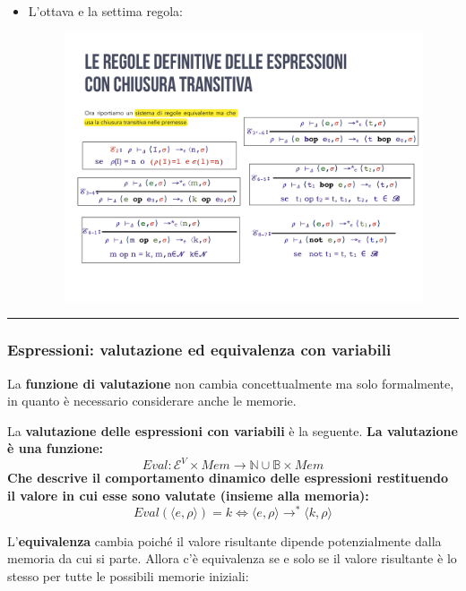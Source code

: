 \documentclass[a4paper]{article}
\newcommand{\longline}{\noindent\rule{\textwidth}{0.4pt}}
\begin{document}
\begin{itemize}
 		\item L'ottava e la settima regola:
 		\begin{figure}[!htp]
 			\centering
 			\includegraphics[width=.7\textwidth]{img/regola_espressione-up-transitiva-8_7.pdf}
 		\end{figure}
 	\end{itemize}
 
 	\longline
 	
 	\subsubsection{Espressioni: valutazione ed equivalenza con variabili}
 	
 	La \textbf{funzione di valutazione} non cambia concettualmente ma solo formalmente, in quanto è necessario considerare anche le memorie.
 	
 	\begin{boxdef}
 		La \textcolor{Red3}{\textbf{valutazione delle espressioni con variabili}} è la seguente. \textbf{La valutazione è una funzione:}
 		\begin{equation*}
 			Eval: \mathcal{E}^{V} \times Mem \longrightarrow \mathbb{N} \cup \mathbb{B} \times Mem
 		\end{equation*}
 		\textbf{Che descrive il comportamento dinamico delle espressioni restituendo il valore in cui esse sono valutate (insieme alla memoria):}
 		\begin{equation*}
 			Eval\left(\langle e, \rho \rangle\right) = k \iff \langle e,\rho \rangle \longrightarrow^{*} \langle k,\rho \rangle
 		\end{equation*}
 	\end{boxdef}\:\newline
 
 	\noindent
 	L'\textbf{equivalenza} cambia poiché il valore risultante dipende potenzialmente dalla memoria da cui si parte. Allora c'è equivalenza se e solo se il valore risultante è lo stesso per tutte le possibili memorie iniziali:
 	
\end{document}
